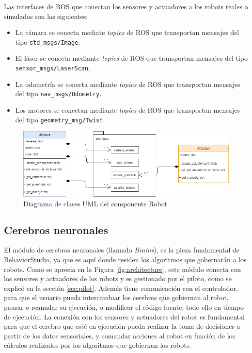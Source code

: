 \noindent Las interfaces de ROS que conectan los sensores y actuadores a los robots reales o simulados son las siguientes:

\begin{itemize}
    \item La cámara se conecta mediate \textit{topics} de ROS que transportan mensajes del tipo \texttt{std\_msgs/Image}.
    \item El láser se conecta mediante \textit{topics} de ROS que transportan mensajes del tipo \texttt{sensor\_msgs/LaserScan}.
    \item La odometría se conecta mediante \textit{topics} de ROS que transportan mensajes del tipo \texttt{nav\_msgs/Odometry}.
    \item Los motores se conectan mediante \textit{topics} de ROS que transportan mensajes del tipo \texttt{geometry\_msg/Twist}.
\end{itemize}

\begin{figure}
  \centering
  \includegraphics[width=1\linewidth]{img/robotuml}
  \caption{Diagrama de clases UML del componente Robot}
  \label{fig:robouml}
\end{figure}

\subsection{Cerebros neuronales}
\label{sec:brainnets}

El módulo de cerebros neuronales (llamado \textit{Brains}), es la pieza fundamental de BehaviorStudio, ya que es aquí donde residen los algoritmos que gobernarán a los robots. Como se aprecia en la Figura \ref{fig:architecture}, este módulo conecta con los sensores y actuadores de los robots y es gestionado por el piloto, como se explicó en la sección \ref{sec:pilot}. Además tiene comunicación con el controlador, para que el usuario pueda intercambiar los cerebros que gobiernan al robot, pausar o reanudar su ejecución, o modificar el código fuente; todo ello en tiempo de ejecución. La conexión con los sensores y actuadores del robot es fundamental para que el cerebro que esté en ejecución pueda realizar la toma de decisiones a partir de los datos sensoriales, y comandar acciones al robot en función de los cálculos realizados por los algoritmos que gobiernan los robots.

